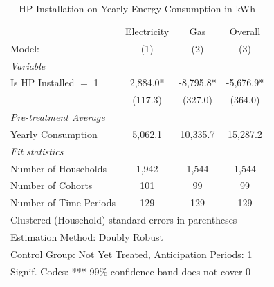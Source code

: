 \begin{table}[htbp]
   \caption{\label{tab:hp-did-cs-never-treated} HP Installation on Yearly Energy Consumption in kWh}
   \centering
   \begin{tabular}{lccc}
      \tabularnewline \midrule \midrule
                                     & Electricity     & Gas     & Overall \\   
      Model:                         & (1)              & (2)              & (3)\\  
      \midrule
      \emph{Variable}\\
      Is HP Installed $=$ 1          & 2,884.0* & -8,795.8* & -5,676.9*\\   
                                     & (117.3)         & (327.0)         & (364.0)\\   
      \midrule
      \emph{Pre-treatment Average}\\
      Yearly Consumption              & 5,062.1 & 10,335.7 & 15,287.2\\   
      \midrule
      \emph{Fit statistics}\\
      Number of Households                   & 1,942           & 1,544           & 1,544\\  
      Number of Cohorts              & 101              & 99              & 99\\  
      Number of Time Periods         & 129             & 129             & 129\\  
      \midrule \midrule
      \multicolumn{4}{l}{Clustered (Household) standard-errors in parentheses}\\
      \multicolumn{4}{l}{Estimation Method: Doubly Robust}\\
      \multicolumn{4}{l}{Control Group: Not Yet Treated, Anticipation Periods: 1}\\
      \multicolumn{4}{l}{Signif. Codes: *** 99\% confidence band does not cover 0}\\
   \end{tabular}
\end{table}

